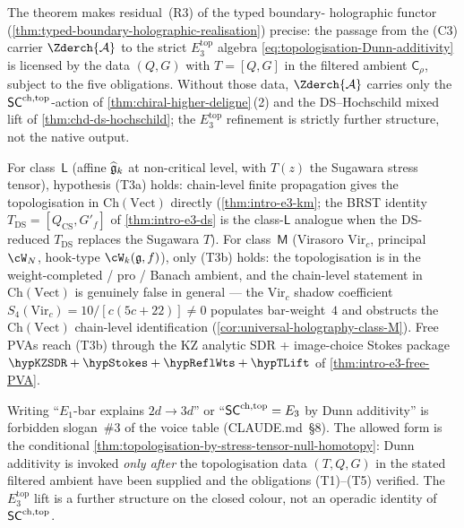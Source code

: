 \begin{remark}%
\label{rem:topologisation-as-R3-of-Phihol}%
%
The theorem makes residual~\textup{(R3)} of the typed boundary-
holographic functor
(\cref{thm:typed-boundary-holographic-realisation}) precise: the passage from the (C3)
carrier $\Zderch{\cA}$ to the strict $E_{3}^{\mathrm{top}}$ algebra
\eqref{eq:topologisation-Dunn-additivity} is licensed by the data
$(Q, G)$ with $T = [Q, G]$ in the filtered ambient
$\mathsf{C}_{\rho}$, subject to the five obligations.  Without those
data, $\Zderch{\cA}$ carries only the $\mathsf{SC}^{\mathrm{ch},\mathrm{top}}$-action of
\cref{thm:chiral-higher-deligne}\,(2) and the DS--Hochschild mixed
lift of \cref{thm:chd-ds-hochschild}; the $E_{3}^{\mathrm{top}}$
refinement is strictly further structure, not the native output.
\end{remark}

\begin{remark}%
\label{rem:class-L-vs-class-M-topologisation}%
%
For class~$\mathsf{L}$ (affine $\widehat{\mathfrak{g}}_{k}$ at non-critical
level, with $T(z)$ the Sugawara stress tensor), hypothesis
\textup{(T3a)} holds: chain-level finite propagation gives the
topologisation in $\mathrm{Ch}(\mathrm{Vect})$ directly
(\cref{thm:intro-e3-km}; the BRST identity
$T_{\mathrm{DS}} = [Q_{\mathrm{CS}}, G'_{f}]$ of
\cref{thm:intro-e3-ds} is the class-$\mathsf{L}$ analogue when
the DS-reduced $T_{\mathrm{DS}}$ replaces the Sugawara $T$).  For
class~$\mathsf{M}$ (Virasoro $\mathrm{Vir}_{c}$, principal $\cW_{N}$,
hook-type $\cW_{k}(\fg, f)$), only \textup{(T3b)} holds: the
topologisation is in the weight-completed / pro / Banach ambient,
and the chain-level statement in $\mathrm{Ch}(\mathrm{Vect})$ is
genuinely false in general --- the $\mathrm{Vir}_{c}$ shadow
coefficient $S_{4}(\mathrm{Vir}_{c}) = 10/[c(5c+22)] \ne 0$
populates bar-weight~$4$ and obstructs the
$\mathrm{Ch}(\mathrm{Vect})$ chain-level identification
(\cref{cor:universal-holography-class-M}).  Free PVAs reach
\textup{(T3b)} through the KZ analytic SDR + image-choice Stokes
package $\hypKZSDR + \hypStokes + \hypReflWts + \hypTLift$ of
\cref{thm:intro-e3-free-PVA}.
\end{remark}

\begin{remark}%
\label{rem:forbidden-slogan-3-as-T-violation}%
%
Writing ``$E_{1}$-bar explains $2d \to 3d$'' or ``$\mathsf{SC}^{\mathrm{ch},\mathrm{top}} = E_{3}$
by Dunn additivity'' is forbidden slogan~\#3 of the voice table
(CLAUDE.md~\S 8).  The allowed form is the conditional
\cref{thm:topologisation-by-stress-tensor-null-homotopy}: Dunn
additivity is invoked \emph{only after} the topologisation data
$(T, Q, G)$ in the stated filtered ambient have been supplied
and the obligations \textup{(T1)}--\textup{(T5)} verified.  The
$E_{3}^{\mathrm{top}}$ lift is a further structure on the closed
colour, not an operadic identity of $\mathsf{SC}^{\mathrm{ch},\mathrm{top}}$.
\end{remark}

